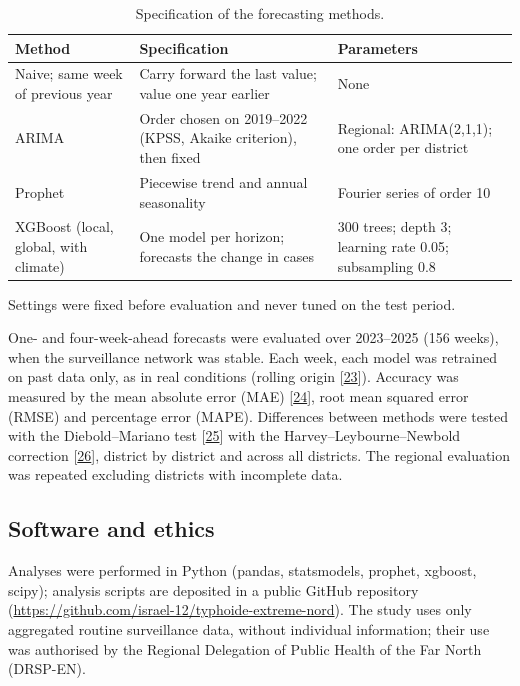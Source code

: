 \documentclass[11pt]{article}
\begin{document}
\begin{table}[!htbp]\centering\small
\caption{Specification of the forecasting methods.}\label{tab:hyper}
\begin{tabularx}{\linewidth}{@{}>{\raggedright\arraybackslash}p{3.6cm} L L@{}}\toprule
Method & Specification & Parameters \\\midrule
Naive; same week of previous year & Carry forward the last value; value one year earlier & None \\
ARIMA & Order chosen on 2019–2022 (KPSS, Akaike criterion), then fixed & Regional: ARIMA(2,1,1); one order per district \\
Prophet & Piecewise trend and annual seasonality & Fourier series of order 10 \\
XGBoost (local, global, with climate) & One model per horizon; forecasts the change in cases & 300 trees; depth 3; learning rate 0.05; subsampling 0.8 \\\bottomrule
\end{tabularx}
\par\smallskip\raggedright Settings were fixed before evaluation and never tuned on the test period.
\end{table}

One- and four-week-ahead forecasts were evaluated over 2023–2025 (156 weeks), when the surveillance network was stable. Each week, each model was retrained on past data only, as in real conditions (rolling origin [\hyperlink{ref23}{23}]). Accuracy was measured by the mean absolute error (MAE) [\hyperlink{ref24}{24}], root mean squared error (RMSE) and percentage error (MAPE). Differences between methods were tested with the Diebold–Mariano test [\hyperlink{ref25}{25}] with the Harvey–Leybourne–Newbold correction [\hyperlink{ref26}{26}], district by district and across all districts. The regional evaluation was repeated excluding districts with incomplete data.

\subsection{Software and ethics}
Analyses were performed in Python (pandas, statsmodels, prophet, xgboost, scipy); analysis scripts are deposited in a public GitHub repository (\url{https://github.com/israel-12/typhoide-extreme-nord}). The study uses only aggregated routine surveillance data, without individual information; their use was authorised by the Regional Delegation of Public Health of the Far North (DRSP-EN).
\end{document}
